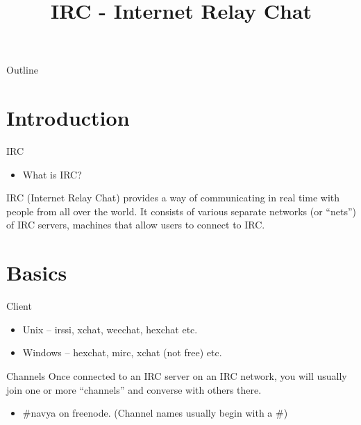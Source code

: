 \documentclass{beamer}
\title{IRC - Internet Relay Chat}
\begin{document}
\begin{frame}
  \titlepage
\end{frame}

\begin{frame}{Outline}
  \tableofcontents
\end{frame}


\section{Introduction}

\begin{frame}{IRC}
  \begin{itemize}
  \item What is IRC?
  \end{itemize}
  IRC (Internet Relay Chat) provides a way of communicating in real time with people from all over the world. It consists of various separate networks (or “nets”) of IRC servers, machines that allow users to connect to IRC. 
\end{frame}

\section{Basics}

\begin{frame}{Client}
  \begin{itemize}
  \item Unix -- irssi, xchat, weechat, hexchat etc.
  \item Windows -- hexchat, mirc, xchat (not free) etc.
  \end{itemize}
\end{frame}

\begin{frame}{Channels}
  Once connected to an IRC server on an IRC network, you will usually join one or more “channels” and converse with others there.
  \begin{itemize}
  \item \#navya on freenode. (Channel names usually begin with a \#)
  \end{itemize}
\end{frame}
\end{document}
